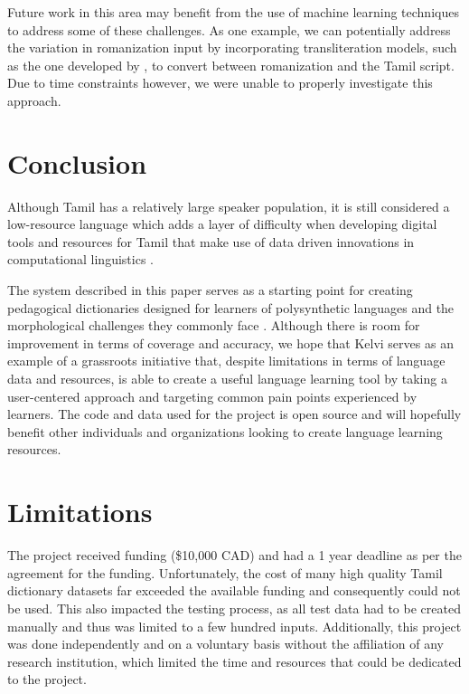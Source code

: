 \documentclass[11pt]{article}
\begin{document}
Future work in this area may benefit from the use of machine learning techniques to address some of these challenges. 
As one example, we can potentially address the variation in romanization input by incorporating transliteration models, 
such as the one developed by \citealp{madhani-etal-2023-aksharantar}, to convert between romanization and the Tamil script. 
Due to time constraints however, we were unable to properly investigate this approach. 

\section{Conclusion}
Although Tamil has a relatively large speaker population, it is still considered a 
low-resource language which adds a layer of difficulty when developing digital tools 
and resources for Tamil that make use of data driven innovations in 
computational linguistics \citep{tissera_natural_2025}.

The system described in this paper serves as a starting point for 
creating pedagogical dictionaries designed for learners of 
polysynthetic languages and the morphological challenges they 
commonly face \citep{kazantseva_kawennonnis_2018}. 
Although there is room for improvement in terms of coverage and accuracy, 
we hope that Kelvi serves as an example of a grassroots initiative that, 
despite limitations in terms of language data and resources, 
is able to create a useful language learning tool by 
taking a user-centered approach and targeting common pain points 
experienced by learners. The code and data used for the project 
is open source and will hopefully benefit other individuals and 
organizations looking to create language learning resources. 

\section{Limitations} \label{sec:limitations}
The project received funding (\$10,000 CAD) and had a 1 year deadline 
as per the agreement for the funding. Unfortunately, the cost of many 
high quality Tamil dictionary datasets far exceeded the available funding 
and consequently could not be used. This also impacted the testing process, 
as all test data had to be created manually and thus was limited to a few hundred inputs. 
Additionally, this project was done independently and on a voluntary basis 
without the affiliation of any research institution, which limited the time and 
resources that could be dedicated to the project. 
\end{document}
